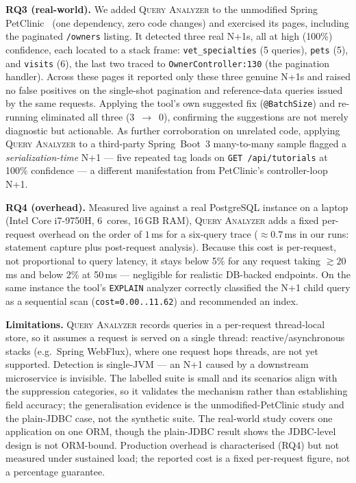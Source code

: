 \documentclass[sigplan,screen]{acmart}
\newcommand{\tool}{\textsc{Query Analyzer}}
\newcommand{\code}[1]{\texttt{\small #1}}
\begin{document}
\noindent\textbf{RQ3 (real-world).} We added \tool{} to the unmodified Spring
PetClinic~\cite{petclinic} (one dependency, zero code changes) and exercised its
pages, including the paginated \code{/owners} listing. It detected three real
N+1s, all at high (100\%) confidence, each located to a stack frame:
\code{vet\_specialties} (5 queries), \code{pets} (5), and \code{visits} (6), the
last two traced to \code{OwnerController:130} (the pagination handler). Across these
pages it reported only these three genuine N+1s and raised no false positives on
the single-shot pagination and reference-data queries issued by the same
requests. Applying the tool's own suggested fix
(\code{@BatchSize}) and re-running eliminated all three (3~$\to$~0), confirming the
suggestions are not merely diagnostic but actionable. As further corroboration on
unrelated code, applying \tool{} to a
third-party Spring~Boot~3 many-to-many sample flagged a \emph{serialization-time}
N+1 --- five repeated tag loads on \code{GET /api/tutorials} at 100\% confidence
--- a different manifestation from PetClinic's controller-loop N+1.

\noindent\textbf{RQ4 (overhead).} Measured live against a real PostgreSQL
instance on a laptop (Intel Core i7-9750H, 6~cores, 16\,GB RAM), \tool{} adds a
fixed per-request overhead on the order of $1$\,ms for a six-query trace
($\approx\!0.7$\,ms in our runs: statement capture plus post-request analysis).
Because this
cost is per-request, not proportional to query latency, it stays below 5\% for
any request taking $\gtrsim\!20$\,ms and below 2\% at 50\,ms --- negligible for
realistic DB-backed endpoints. On the same instance the tool's \texttt{EXPLAIN} analyzer correctly
classified the N+1 child query as a sequential scan (\code{cost=0.00..11.62}) and
recommended an index.

\noindent\textbf{Limitations.} \tool{} records queries in a per-request
thread-local store, so it assumes a request is served on a single thread:
reactive/asynchronous stacks (e.g.\ Spring WebFlux), where one request hops
threads, are not yet supported. Detection is single-JVM --- an N+1 caused by a
downstream microservice is invisible. The labelled suite is small and its
scenarios align with the suppression categories, so it validates the mechanism
rather than establishing field accuracy; the generalisation evidence is the
unmodified-PetClinic study and the plain-JDBC case, not the synthetic suite. The
real-world study covers one application on one ORM, though the plain-JDBC result
shows the JDBC-level design is not ORM-bound. Production overhead is
characterised (RQ4) but not measured under sustained load; the reported cost is a
fixed per-request figure, not a percentage guarantee.
\end{document}
